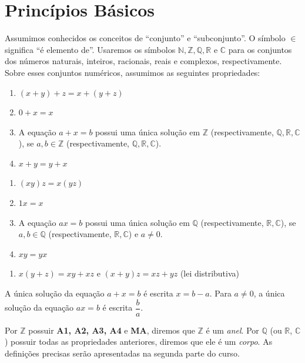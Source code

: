 \section{Princípios Básicos}

Assumimos conhecidos os conceitos de ``conjunto'' e ``subconjunto''. 
O símbolo $\in$ significa ``é elemento de''. 
Usaremos os símbolos $\mathbb{N}, \mathbb{Z}, \mathbb{Q}, \mathbb{R}$ e $\mathbb{C}$ 
para os conjuntos dos números naturais, inteiros, racionais, reais e complexos, 
respectivamente. Sobre esses conjuntos numéricos, assumimos as seguintes propriedades:

\begin{enumerate}[label=\textbf{A\arabic*.}, left=0.5cm, align=left, nosep]
    \item $(x + y) + z = x + (y + z)$
    \item $0 + x = x$
    \item A equação $a + x = b$ possui uma única solução em $\mathbb{Z}$ 
    (respectivamente, $\mathbb{Q}, \mathbb{R}, \mathbb{C}$), se $a, b \in \mathbb{Z}$ 
    (respectivamente, $\mathbb{Q}, \mathbb{R}, \mathbb{C}$).
    \item $x + y = y + x$
\end{enumerate}

\begin{enumerate}[label=\textbf{M\arabic*.}, left=0.5cm, align=left, nosep]
    \item $(xy)z = x(yz)$
    \item $1x = x$
    \item A equação $ax = b$ possui uma única solução em $\mathbb{Q}$ 
    (respectivamente, $\mathbb{R}, \mathbb{C}$), se $a, b \in \mathbb{Q}$ 
    (respectivamente, $\mathbb{R}, \mathbb{C}$) e $a \neq 0$.
    \item $xy = yx$
\end{enumerate}

\begin{enumerate}[label=\textbf{MA.}, left=0.5cm, align=left, nosep]
    \item $x(y + z) = xy + xz$ e $(x + y)z = xz + yz$ \textnormal{(lei distributiva)}
\end{enumerate}

A única solução da equação $a + x = b$ é escrita $x = b - a$. 
Para $a \neq 0$, a única solução da equação $ax = b$ é escrita $\dfrac{b}{a}$.

Por $\mathbb{Z}$ possuir \textbf{A1, A2, A3, A4} e \textbf{MA}, diremos que 
$\mathbb{Z}$ é um \emph{anel}. 
Por $\mathbb{Q}$ (ou $\mathbb{R}$, $\mathbb{C}$) possuir todas as propriedades 
anteriores, diremos que ele é um \emph{corpo}. 
As definições precisas serão apresentadas na segunda parte do curso.

